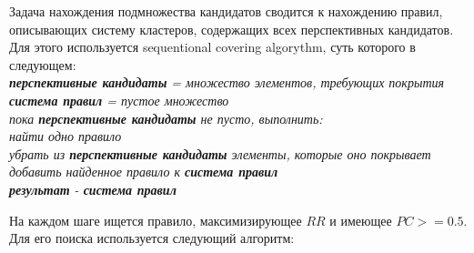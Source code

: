 Задача нахождения подмножества кандидатов сводится к нахождению правил, описывающих систему кластеров, содержащих всех перспективных кандидатов. Для этого используется sequentional covering algorythm, суть которого в следующем:\\

\noindent 
\textit{\textbf{перспективные кандидаты} = множество элементов, требующих покрытия\\
\textbf{система правил} = пустое множество\\
пока \textbf{перспективные кандидаты} не пусто, выполнить:\\
\-\hspace{1cm}	найти одно правило\\
\-\hspace{1cm}	убрать из \textbf{перспективные кандидаты} элементы, которые оно покрывает\\
\-\hspace{1cm}	добавить найденное правило к \textbf{система правил}\\
\textbf{результат} - \textbf{система правил}\\
} %

На каждом шаге ищется правило, максимизирующее $RR$ и имеющее $PC >= 0.5$. Для его поиска используется следующий алгоритм:\\

